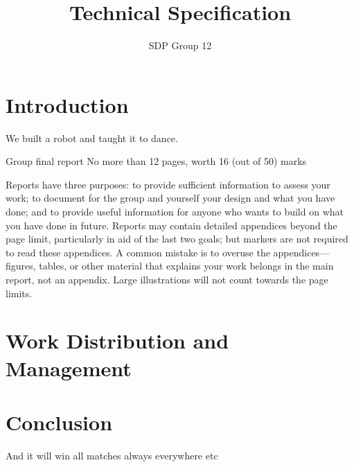 \documentclass[12pt,a4paper]{article}
\author{SDP Group 12}
\title{Technical Specification}
\begin{document}
\maketitle
\section{Introduction}
We built a robot and taught it to dance.

Group final report No more than 12 pages, worth 16 (out of 50) marks

Reports have three purposes: to provide sufficient information to assess your work; to
document for the group and yourself your design and what you have done; and to provide
useful information for anyone who wants to build on what you have done in future.
Reports may contain detailed appendices beyond the page limit, particularly in aid of the
last two goals; but markers are not required to read these appendices. A common mistake
is to overuse the appendices— figures, tables, or other material that explains your work
belongs in the main report, not an appendix. Large illustrations will not count towards
the page limits.

\section{Work Distribution and Management}









\section{Conclusion}
And it will win all matches always everywhere etc
\end{document}
